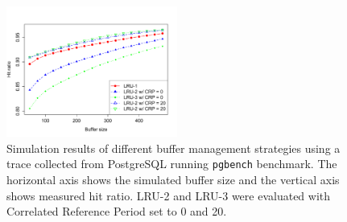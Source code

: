 \begin{figure}[t!]
    \centering
	\includegraphics[width=0.5\textwidth]{./figures/postgres.pdf}
	\caption{Simulation results of different buffer management strategies using a trace collected from PostgreSQL running \texttt{pgbench} benchmark. The horizontal axis shows the simulated buffer size and the vertical axis shows measured hit ratio. LRU-2 and LRU-3 were evaluated with Correlated Reference Period set to 0 and 20.}
	\label{fig:postgres}
\end{figure}
